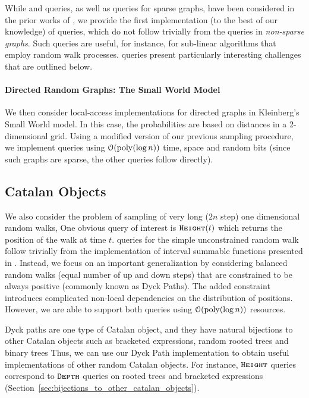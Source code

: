 While  and  queries, as well as  queries for sparse graphs,
have been considered in the prior works of \cite{reut, huge_old, huge, sparse}, we provide the first implementation (to the best of our knowledge)
of  queries, which do not follow trivially from the  queries in \emph{non-sparse graphs}.
Such queries are useful, for instance, for sub-linear algorithms that employ random walk processes.
 queries present particularly interesting challenges that are outlined below.


\paragraph*{Directed Random Graphs: The Small World Model}
\label{par:directed_random_graphs}
We then consider local-access implementations for directed graphs in Kleinberg's Small World model.
In this case, the probabilities are based on distances in a 2-dimensional grid.
Using a modified version of our previous sampling procedure, we implement  queries using
$\mathcal{O}(\mathrm{poly}(\log n))$ time, space and random bits (since such graphs are sparse, the other queries follow directly).




\subsection{Catalan Objects}%
\label{sec:intro_catalan_objects}
We also consider the problem of sampling of very long ($2n$ step) one dimensional random walks,
One obvious query of interest is $\texttt{\textsc{Height}}(t)$ which returns the position of the walk at time $t$.
 queries for the simple unconstrained random walk
follow trivially from the implementation of interval summable functions presented in \cite{huge}.
Instead, we focus on an important generalization by considering balanced random walks (equal number of up and down steps)
that are constrained to be always positive (commonly known as Dyck Paths).
The added constraint introduces complicated non-local dependencies on the distribution of positions.
However, we are able to support both queries using $\mathcal O(\mathrm{poly}(\log n))$ resources.

Dyck paths are one type of Catalan object, and they have natural bijections to other Catalan objects
such as bracketed expressions, random rooted trees and binary trees
Thus, we can use our Dyck Path implementation to obtain useful implementations of other random Catalan objects.
For instance, $\texttt{\textsc{Height}}$ queries correspond to $\texttt{\textsc{Depth}}$ queries on rooted trees and bracketed expressions
(Section~\ref{sec:bijections_to_other_catalan_objects}).

